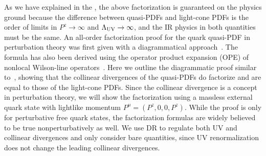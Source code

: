 As we have explained in the , the above factorization is guaranteed on the physics ground because
the difference between quasi-PDFs and light-cone PDFs is the order of limits in $P^z\to \infty$ and $\Lambda_{\rm UV}\to \infty$, and the IR physics in both quantities must be the same. An all-order
factorization proof for the quark quasi-PDF in perturbation theory was first given with a diagrammatical approach~\cite{Ma:2014jla}. The formula has also been derived using the operator product expansion (OPE) of nonlocal Wilson-line operators~\cite{Izubuchi:2018srq,Ma:2017pxb,Wang:2019tgg}.
Here we outline the diagrammatic proof similar to~\cite{Ma:2014jla}, showing
that the collinear divergences of the quasi-PDFs do factorize and
are equal to those of the light-cone PDFs.
Since the collinear divergence is a concept
in perturbation theory, we will show the factorization using a massless external quark state with lightlike momentum $P^\mu=(P^z,0,0,P^z)$.  While the proof is only for perturbative free quark states,
the factorization formulas are widely believed to be true nonperturbatively as well.
We use DR to regulate both UV and collinear divergences and only consider bare quantities, since UV renormalization does not change the leading collinear divergences.

